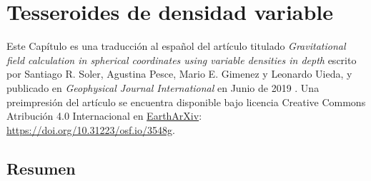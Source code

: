 \chapter{Tesseroides de densidad variable}
\label{cha:tesseroids-variable-density}

Este Capítulo es una traducción al español del artículo titulado
\emph{Gravitational field calculation in spherical coordinates using variable
densities in depth} escrito por Santiago R. Soler, Agustina Pesce, Mario E.
Gimenez y Leonardo Uieda, y publicado en \emph{Geophysical Journal
International} en Junio de 2019 \citep{soler2019}.
Una preimpresión del artículo se encuentra disponible bajo licencia Creative
Commons Atribución 4.0 Internacional en
\href{https://eartharxiv.org/}{EarthArXiv}:
\url{https://doi.org/10.31223/osf.io/3548g}.

\section{Resumen}

